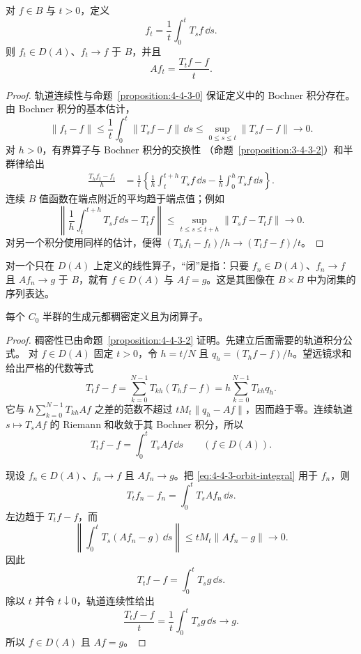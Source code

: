 \begin{proposition}\label{proposition:4-4-3-2}
对 $f\in B$ 与 $t>0$，定义
\[
 f_t=\frac1t\int_0^tT_sf\,\dd s.
\]
则 $f_t\in D(A)$、$f_t\to f$ 于 $B$，并且
\[
 Af_t=\frac{T_tf-f}{t}.
\]
\end{proposition}

\begin{proof}
轨道连续性与命题~\ref{proposition:4-4-3-0} 保证定义中的 Bochner 积分存在。
由 Bochner 积分的基本估计，
\[
 \|f_t-f\|
 \le\frac1t\int_0^t\|T_sf-f\|\,\dd s
 \le\sup_{0\le s\le t}\|T_sf-f\|\longrightarrow0.
\]
对 $h>0$，有界算子与 Bochner 积分的交换性
（命题~\ref{proposition:3-4-3-2}）和半群律给出
\begin{align*}
 \frac{T_hf_t-f_t}{h}
 &=\frac1t\left\{
   \frac1h\int_t^{t+h}T_sf\,\dd s
   -\frac1h\int_0^hT_sf\,\dd s\right\}.
\end{align*}
连续 $B$ 值函数在端点附近的平均趋于端点值；例如
\[
 \left\|\frac1h\int_t^{t+h}T_sf\,\dd s-T_tf\right\|
 \le\sup_{t\le s\le t+h}\|T_sf-T_tf\|\longrightarrow0.
\]
对另一个积分使用同样的估计，便得
$(T_hf_t-f_t)/h\to(T_tf-f)/t$。
\end{proof}

对一个只在 $D(A)$ 上定义的线性算子，“闭”是指：只要
$f_n\in D(A)$、$f_n\to f$ 且 $Af_n\to g$ 于 $B$，就有
$f\in D(A)$ 与 $Af=g$。这是其图像在 $B\times B$ 中为闭集的序列表达。

\begin{proposition}[生成元的闭性]\label{proposition:4-4-3-5}
每个 $C_0$ 半群的生成元都稠密定义且为闭算子。
\end{proposition}

\begin{proof}
稠密性已由命题~\ref{proposition:4-4-3-2} 证明。先建立后面需要的轨道积分公式。
对 $f\in D(A)$ 固定 $t>0$，令 $h=t/N$ 且
$q_h=(T_hf-f)/h$。望远镜求和给出严格的代数等式
\[
 T_tf-f
 =\sum_{k=0}^{N-1}T_{kh}(T_hf-f)
 =h\sum_{k=0}^{N-1}T_{kh}q_h.
\]
它与 $h\sum_{k=0}^{N-1}T_{kh}Af$ 之差的范数不超过
$tM_t\|q_h-Af\|$，因而趋于零。连续轨道
$s\mapsto T_sAf$ 的 Riemann 和收敛于其 Bochner 积分，所以
\begin{equation}\label{eq:4-4-3-orbit-integral}
 T_tf-f=\int_0^tT_sAf\,\dd s
 \qquad(f\in D(A)).
\end{equation}

现设 $f_n\in D(A)$、$f_n\to f$ 且 $Af_n\to g$。把
\eqref{eq:4-4-3-orbit-integral} 用于 $f_n$，则
\[
 T_tf_n-f_n=\int_0^tT_sAf_n\,\dd s.
\]
左边趋于 $T_tf-f$，而
\[
 \left\|\int_0^tT_s(Af_n-g)\,\dd s\right\|
 \le tM_t\|Af_n-g\|\longrightarrow0.
\]
因此
\[
 T_tf-f=\int_0^tT_sg\,\dd s.
\]
除以 $t$ 并令 $t\downarrow0$，轨道连续性给出
\[
 \frac{T_tf-f}{t}=\frac1t\int_0^tT_sg\,\dd s\longrightarrow g.
\]
所以 $f\in D(A)$ 且 $Af=g$。
\end{proof}

